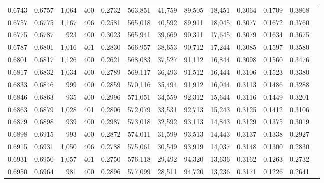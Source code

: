 \begin{tabular}{rrrrrrrrrrrrr}
0.6743 & 0.6757 &  1,064 & 400 &                                     0.2732 & 563,851 &  41,759 &  89,505 &  18,451 & 0.3064 & 0.1709 & 0.3868 \\
0.6757 & 0.6775 &  1,167 & 406 &                                     0.2581 & 565,018 &  40,592 &  89,911 &  18,045 & 0.3077 & 0.1672 & 0.3760 \\
0.6775 & 0.6787 &    923 & 400 &                                     0.3023 & 565,941 &  39,669 &  90,311 &  17,645 & 0.3079 & 0.1634 & 0.3675 \\
0.6787 & 0.6801 &  1,016 & 401 &                                     0.2830 & 566,957 &  38,653 &  90,712 &  17,244 & 0.3085 & 0.1597 & 0.3580 \\
0.6801 & 0.6817 &  1,126 & 400 &                                     0.2621 & 568,083 &  37,527 &  91,112 &  16,844 & 0.3098 & 0.1560 & 0.3476 \\
0.6817 & 0.6832 &  1,034 & 400 &                                     0.2789 & 569,117 &  36,493 &  91,512 &  16,444 & 0.3106 & 0.1523 & 0.3380 \\
0.6833 & 0.6846 &    999 & 400 &                                     0.2859 & 570,116 &  35,494 &  91,912 &  16,044 & 0.3113 & 0.1486 & 0.3288 \\
0.6846 & 0.6863 &    935 & 400 &                                     0.2996 & 571,051 &  34,559 &  92,312 &  15,644 & 0.3116 & 0.1449 & 0.3201 \\
0.6863 & 0.6879 &  1,028 & 401 &                                     0.2806 & 572,079 &  33,531 &  92,713 &  15,243 & 0.3125 & 0.1412 & 0.3106 \\
0.6879 & 0.6898 &    939 & 400 &                                     0.2987 & 573,018 &  32,592 &  93,113 &  14,843 & 0.3129 & 0.1375 & 0.3019 \\
0.6898 & 0.6915 &    993 & 400 &                                     0.2872 & 574,011 &  31,599 &  93,513 &  14,443 & 0.3137 & 0.1338 & 0.2927 \\
0.6915 & 0.6931 &  1,050 & 406 &                                     0.2788 & 575,061 &  30,549 &  93,919 &  14,037 & 0.3148 & 0.1300 & 0.2830 \\
0.6931 & 0.6950 &  1,057 & 401 &                                     0.2750 & 576,118 &  29,492 &  94,320 &  13,636 & 0.3162 & 0.1263 & 0.2732 \\
0.6950 & 0.6964 &    981 & 400 &                                     0.2896 & 577,099 &  28,511 &  94,720 &  13,236 & 0.3171 & 0.1226 & 0.2641 \\

\end{tabular}

